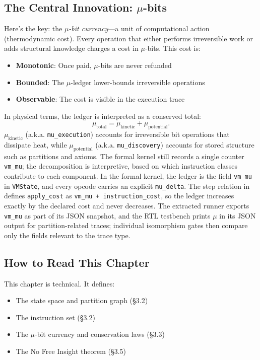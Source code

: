 \subsection{The Central Innovation: $\mu$-bits}

Here's the key: the \textit{$\mu$-bit currency}---a unit of computational action (thermodynamic cost). Every operation that either performs irreversible work or adds structural knowledge charges a cost in $\mu$-bits. This cost is:
\begin{itemize}
    \item \textbf{Monotonic}: Once paid, $\mu$-bits are never refunded
    \item \textbf{Bounded}: The $\mu$-ledger lower-bounds irreversible operations
    \item \textbf{Observable}: The cost is visible in the execution trace
\end{itemize}
In physical terms, the ledger is interpreted as a conserved total:
\[
    \mu_{\text{total}} = \mu_{\text{kinetic}} + \mu_{\text{potential}}.
\]
$\mu_{\text{kinetic}}$ (a.k.a. \texttt{mu\_execution}) accounts for irreversible bit operations that dissipate heat, while $\mu_{\text{potential}}$ (a.k.a. \texttt{mu\_discovery}) accounts for stored structure such as partitions and axioms. The formal kernel still records a single counter \texttt{vm\_mu}; the decomposition is interpretive, based on which instruction classes contribute to each component.
In the formal kernel, the ledger is the field \texttt{vm\_mu} in \texttt{VMState}, and every opcode carries an explicit \texttt{mu\_delta}. The step relation in  defines \texttt{apply\_cost} as \texttt{vm\_mu + instruction\_cost}, so the ledger increases exactly by the declared cost and never decreases. The extracted runner exports \texttt{vm\_mu} as part of its JSON snapshot, and the RTL testbench prints $\mu$ in its JSON output for partition-related traces; individual isomorphism gates then compare only the fields relevant to the trace type.

\subsection{How to Read This Chapter}

This chapter is technical. It defines:
\begin{itemize}
    \item The state space and partition graph (\S3.2)
    \item The instruction set (\S3.2)
    \item The $\mu$-bit currency and conservation laws (\S3.3)
    \item The No Free Insight theorem (\S3.5)
\end{itemize}

